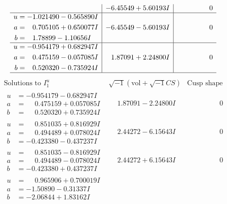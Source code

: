 \documentclass[1p]{elsarticle_modified}
\theoremstyle{definition}
\newcommand{\I}{\sqrt{-1}}
\begin{document}
$$\begin{array}{c|c|c}
 & -6.45549 + 5.60193 I & \phantom{-0.000000 } 0 \\ \hline\begin{aligned}
u &= -1.021490 - 0.565890 I \\
a &= \phantom{-}0.705105 + 0.650077 I \\
b &= \phantom{-}1.78899 - 1.10656 I\end{aligned}
 & -6.45549 - 5.60193 I & \phantom{-0.000000 } 0 \\ \hline\begin{aligned}
u &= -0.954179 + 0.682947 I \\
a &= \phantom{-}0.475159 - 0.057085 I \\
b &= \phantom{-}0.520320 - 0.735924 I\end{aligned}
 & \phantom{-}1.87091 + 2.24800 I & \phantom{-0.000000 } 0\\
 \hline 
 \end{array}$$\newpage$$\begin{array}{c|c|c}  
\text{Solutions to }I^u_{1}& \I (\text{vol} + \sqrt{-1}CS) & \text{Cusp shape}\\
 \hline 
\begin{aligned}
u &= -0.954179 - 0.682947 I \\
a &= \phantom{-}0.475159 + 0.057085 I \\
b &= \phantom{-}0.520320 + 0.735924 I\end{aligned}
 & \phantom{-}1.87091 - 2.24800 I & \phantom{-0.000000 } 0 \\ \hline\begin{aligned}
u &= \phantom{-}0.851035 + 0.816929 I \\
a &= \phantom{-}0.494489 + 0.078024 I \\
b &= -0.423380 - 0.437237 I\end{aligned}
 & \phantom{-}2.44272 - 6.15643 I & \phantom{-0.000000 } 0 \\ \hline\begin{aligned}
u &= \phantom{-}0.851035 - 0.816929 I \\
a &= \phantom{-}0.494489 - 0.078024 I \\
b &= -0.423380 + 0.437237 I\end{aligned}
 & \phantom{-}2.44272 + 6.15643 I & \phantom{-0.000000 } 0 \\ \hline\begin{aligned}
u &= \phantom{-}0.965906 + 0.700019 I \\
a &= -1.50890 - 0.31337 I \\
b &= -2.06844 + 1.83162 I\end{aligned}

\end{array}$$
\end{document}
